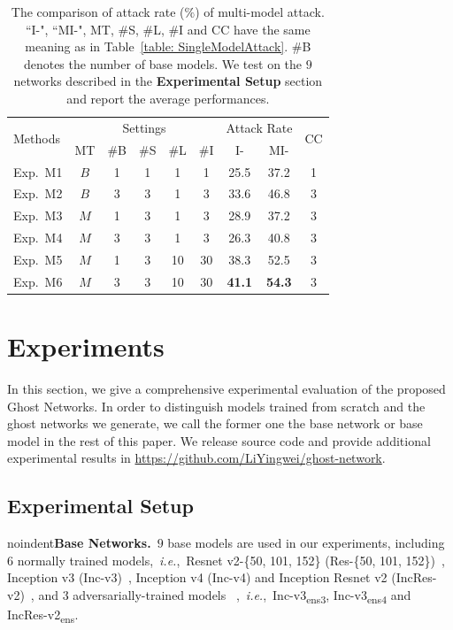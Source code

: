 \documentclass[letterpaper]{article} %
\def\ie{\emph{i.e.}}
\begin{document}
\begin{table}[tb]
\centering
\small
\begin{tabular}{|l|ccccc|cc|c|}
\hline
\multirow{2}{*}{Methods} & \multicolumn{5}{c|}{Settings} & \multicolumn{2}{c|}{Attack Rate} & \multirow{2}{*}{CC}  \\
\cline{2-8}
   & MT & \#B & \#S & \#L & \#I & I- & MI- &\\
\hline
\hline
Exp.~M1 & $B$ & 1 & 1 & 1 & 1  & 25.5 & 37.2 & 1 \\
Exp.~M2 & $B$ & 3 & 3 & 1 & 3  & 33.6 & 46.8 & 3 \\
Exp.~M3 & $M$ & 1 & 3 & 1 & 3  & 28.9 & 37.2 & 3 \\
Exp.~M4 & $M$ & 3 & 3 & 1 & 3  & 26.3 & 40.8 & 3 \\
Exp.~M5 & $M$ & 1 & 3 & 10& 30 & 38.3 & 52.5 & 3 \\
Exp.~M6 & $M$ & 3 & 3 & 10& 30 & \textbf{41.1} & \textbf{54.3} & 3 \\
\hline
\end{tabular}
\caption{The comparison of attack rate ($\%$) of multi-model attack. ``I-", ``MI-", MT, \#S, \#L, \#I and CC have the same meaning as in Table~\ref{table: SingleModelAttack}. \#B denotes the number of base models. We test on the $9$ networks described in the \textbf{Experimental Setup} section and report the average performances.}
\label{table: MultiModelAttack}
\end{table}

\section{Experiments}
In this section, we give a comprehensive experimental evaluation of the proposed Ghost Networks. In order to distinguish models trained from scratch and the ghost networks we generate, we call the former one the base network or base model in the rest of this paper. We release source code and provide additional experimental results in \url{https://github.com/LiYingwei/ghost-network}.

\subsection{Experimental Setup} \label{sec:setupExp}
noindent\textbf{Base Networks.}~$9$ base models are used in our experiments,  including $6$ normally trained models,~\ie,~Resnet v2-\{50, 101, 152\} (Res-\{50, 101, 152\})~\cite{he2016identity}, Inception v3 (Inc-v3)~\cite{szegedy2017inception}, Inception v4 (Inc-v4) and Inception Resnet v2 (IncRes-v2)~\cite{szegedy2016rethinking}, and $3$ adversarially-trained models~\cite{tramer2017ensemble}%
,~\ie,~Inc-v3\textsubscript{ens3}, Inc-v3\textsubscript{ens4} and IncRes-v2\textsubscript{ens}.
\end{document}
